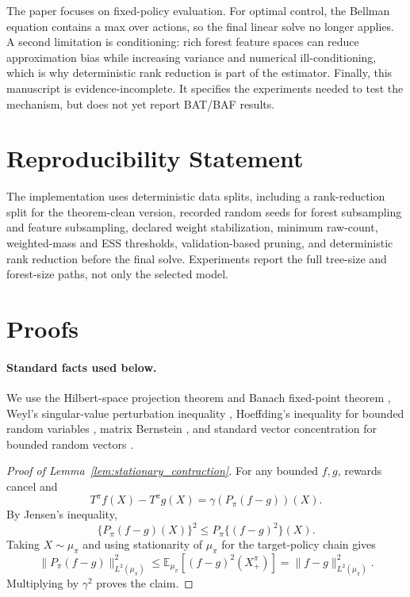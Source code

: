 \documentclass{article}
\newcommand{\E}{\mathbb{E}}
\theoremstyle{plain}
\theoremstyle{definition}
\theoremstyle{remark}
\begin{document}
The paper focuses on fixed-policy evaluation. For optimal control, the Bellman
equation contains a max over actions, so the final linear solve no longer
applies. A second limitation is conditioning: rich forest feature spaces can
reduce approximation bias while increasing variance and numerical
ill-conditioning, which is why deterministic rank reduction is part of the
estimator. Finally, this manuscript is evidence-incomplete. It specifies the
experiments needed to test the mechanism, but does not yet report BAT/BAF
results.

\section*{Reproducibility Statement}

The implementation uses deterministic data splits, including a rank-reduction
split for the theorem-clean version, recorded random seeds for forest
subsampling and feature subsampling, declared weight stabilization, minimum
raw-count, weighted-mass and ESS thresholds, validation-based pruning, and
deterministic rank reduction before the final solve. Experiments report the
full tree-size and forest-size paths, not only the selected model.




\appendix

\section{Proofs}
\label{app:proofs}

\paragraph{Standard facts used below.}
We use the Hilbert-space projection theorem and Banach fixed-point theorem
\citep{conway1994course}, Weyl's singular-value perturbation inequality
\citep{horn2012matrix}, Hoeffding's inequality for bounded random variables
\citep{hoeffding1963probability}, matrix Bernstein
\citep{tropp2012user}, and standard vector concentration for bounded random
vectors \citep{wainwright2019high}.

\begin{proof}[Proof of Lemma~\ref{lem:stationary_contraction}]
For any bounded \(f,g\), rewards cancel and
\[
  T^\pi f(X)-T^\pi g(X)
  =
  \gamma (P_\pi(f-g))(X).
\]
By Jensen's inequality,
\[
  \{P_\pi(f-g)(X)\}^2
  \le
  P_\pi\{(f-g)^2\}(X).
\]
Taking \(X\sim\mu_\pi\) and using stationarity of \(\mu_\pi\) for the
target-policy chain gives
\[
  \|P_\pi(f-g)\|_{L^2(\mu_\pi)}^2
  \le
  \E_{\mu_\pi}[(f-g)^2(X^\pi_+)]
  =
  \|f-g\|_{L^2(\mu_\pi)}^2.
\]
Multiplying by \(\gamma^2\) proves the claim.
\end{proof}
\end{document}
